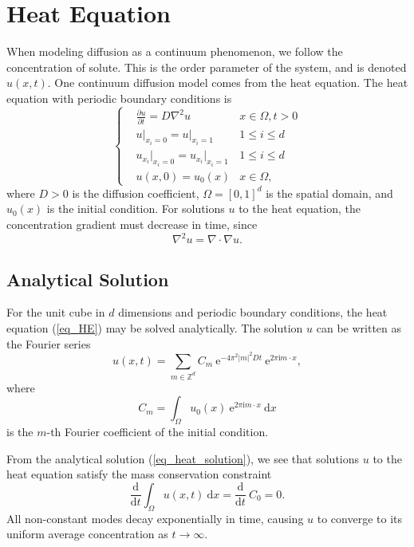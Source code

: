\documentclass[12pt, reqno]{report}
\theoremstyle{definition}
\theoremstyle{remark}
\newcommand{\ud}{\mathrm{d}}
\newcommand{\e}{\mathrm{e}}
\renewcommand{\i}{\mathrm{i}}
\begin{document}
\section{Heat Equation} \label{sec_heat}

When modeling diffusion as a continuum phenomenon, we follow the concentration of solute.
This is the order parameter of the system, and is denoted $u(x,t)$.
One continuum diffusion model comes from the heat equation.
The heat equation with periodic boundary conditions is
\begin{equation} \label{eq_HE}
    \left\{
        \begin{split}
            &\frac{\partial u}{\partial t}=D\nabla^2u&x\in\Omega,t>0\\
            &u\big|_{x_i=0}=u\big|_{x_i=1}&1\le i\le d\\
            &u_{x_i}\big|_{x_i=0}=u_{x_i}\big|_{x_i=1}&1\le i\le d\\
            &u(x,0)=u_0(x)&x\in\Omega,
        \end{split}	
    \right.
\end{equation}
where $D>0$ is the diffusion coefficient, $\Omega=[0,1]^d$ is the spatial domain, and $u_0(x)$ is the initial condition. 
For solutions $u$ to the heat equation, the concentration gradient must decrease in time, since
\begin{equation}
    \nabla^2u=\nabla\cdot\nabla u.
\end{equation}


\subsection{Analytical Solution} \label{sssec_analytical}

For the unit cube in $d$ dimensions and periodic boundary conditions, the heat equation (\ref{eq_HE}) may be solved analytically.
The solution $u$ can be written as the Fourier series
\begin{equation} \label{eq_heat_solution}
    u(x,t)=\sum_{m\in\mathbb{Z }^d}C_m ~\e^{-4\pi^2|m|^2Dt}~\mathrm{e}^{2\pi\i m\cdot x},
\end{equation}
where 
\begin{equation}
    C_m=\int_{\Omega}u_0(x)~\e^{2\pi\i m\cdot x}~\ud x 
\end{equation}
is the $m$-th Fourier coefficient of the initial condition.

From the analytical solution (\ref{eq_heat_solution}), we see that solutions $u$ to the heat equation satisfy the mass conservation constraint
\begin{equation} \label{eq_mass_con}
    \frac{\ud}{\ud t}\int_\Omega u(x,t)~\ud x=\frac{\ud}{\ud t}~C_0=0.
\end{equation}
All non-constant modes decay exponentially in time, causing $u$ to converge to its uniform average concentration as $t\to\infty$. 
\end{document}
